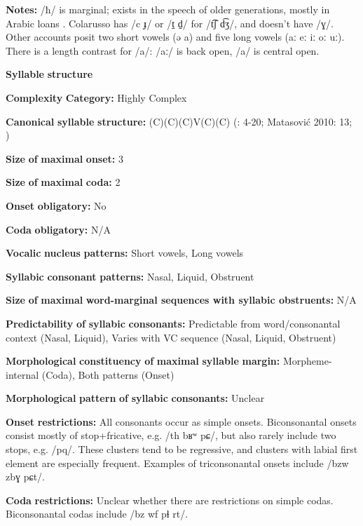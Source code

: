 \textbf{Notes:} /ħ/ is marginal; exists in the speech of older generations, mostly in Arabic loans \citep[10]{Matasovic2010}. Colarusso has /c ɟ/ or /t̠ d̠/ for /t͡ʃ d͡ʒ/, and doesn’t have /ɣ/. Other accounts posit two short vowels (ə a) and five long vowels (aː eː iː oː uː). There is a length contrast for /a/: /aː/ is back open, /a/ is central open.

\textbf{Syllable} \textbf{structure}

\textbf{Complexity} \textbf{Category:} Highly Complex

\textbf{Canonical} \textbf{syllable} \textbf{structure:} (C)(C)(C)V(C)(C) (\citealt{Colarusso2006}: 4-20; Matasović 2010: 13; \citealt{Applebaum2013})

\textbf{Size} \textbf{of} \textbf{maximal} \textbf{onset:} 3

\textbf{Size} \textbf{of} \textbf{maximal} \textbf{coda:} 2

\textbf{Onset} \textbf{obligatory:} No

\textbf{Coda} \textbf{obligatory:} N/A

\textbf{Vocalic} \textbf{nucleus} \textbf{patterns:} Short vowels, Long vowels

\textbf{Syllabic} \textbf{consonant} \textbf{patterns:} Nasal, Liquid, Obstruent

\textbf{Size} \textbf{of} \textbf{maximal} \textbf{word{}-marginal sequences with syllabic obstruents:} N/A

\textbf{Predictability} \textbf{of} \textbf{syllabic} \textbf{consonants:} Predictable from word/consonantal context (Nasal, Liquid), Varies with VC sequence (Nasal, Liquid, Obstruent)

\textbf{Morphological} \textbf{constituency} \textbf{of} \textbf{maximal} \textbf{syllable} \textbf{margin:} Morpheme-internal (Coda), Both patterns (Onset)

\textbf{Morphological} \textbf{pattern} \textbf{of} \textbf{syllabic} \textbf{consonants:} Unclear

\textbf{Onset} \textbf{restrictions:} All consonants occur as simple onsets. Biconsonantal onsets consist mostly of stop+fricative, e.g. /th bʁʷ pɕ/, but also rarely include two stops, e.g. /pq/. These clusters tend to be regressive, and clusters with labial first element are especially frequent. Examples of triconsonantal onsets include /bzw zbɣ pɕt/.

\textbf{Coda} \textbf{restrictions:} Unclear whether there are restrictions on simple codas. Biconsonantal codas include /bz wf pɬ rt/.

